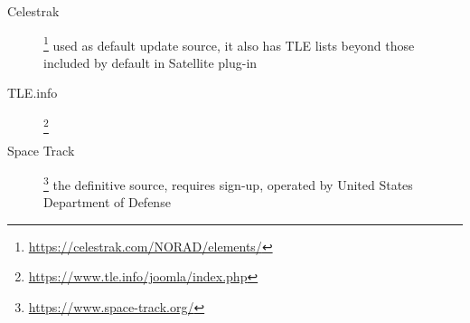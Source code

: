 \begin{description}
\item[Celestrak]\footnote{\url{https://celestrak.com/NORAD/elements/}} used as default update source, it also has TLE lists
  beyond those included by default in Satellite plug-in
\item[TLE.info]\footnote{\url{https://www.tle.info/joomla/index.php}}
\item[Space Track]\footnote{\url{https://www.space-track.org/}} the definitive source, requires sign-up, operated by
  United States Department of Defense
\end{description}

%
%
%


